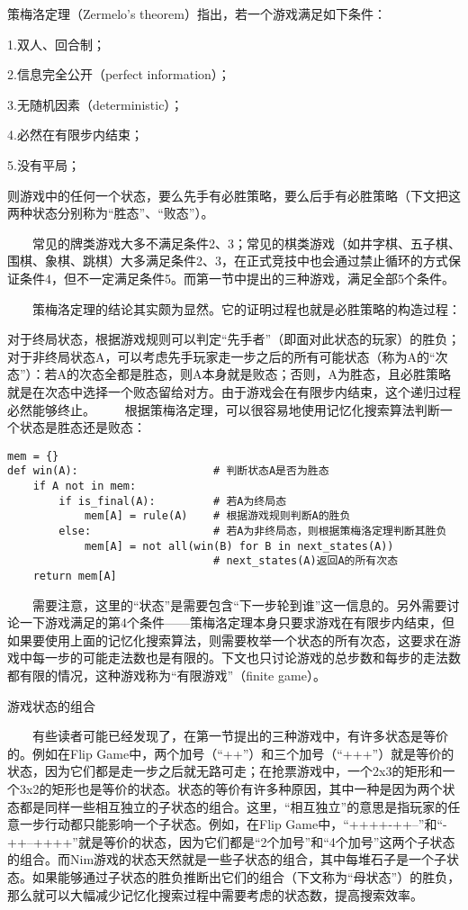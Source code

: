 策梅洛定理（Zermelo's theorem）指出，若一个游戏满足如下条件：

1.双人、回合制；

2.信息完全公开（perfect information）；

3.无随机因素（deterministic）；

4.必然在有限步内结束；

5.没有平局；

则游戏中的任何一个状态，要么先手有必胜策略，要么后手有必胜策略（下文把这两种状态分别称为“胜态”、“败态”）。

　　常见的牌类游戏大多不满足条件2、3；常见的棋类游戏（如井字棋、五子棋、围棋、象棋、跳棋）大多满足条件2、3，在正式竞技中也会通过禁止循环的方式保证条件4，但不一定满足条件5。而第一节中提出的三种游戏，满足全部5个条件。

　　策梅洛定理的结论其实颇为显然。它的证明过程也就是必胜策略的构造过程：

对于终局状态，根据游戏规则可以判定“先手者”（即面对此状态的玩家）的胜负；
对于非终局状态A，可以考虑先手玩家走一步之后的所有可能状态（称为A的“次态”）：若A的次态全都是胜态，则A本身就是败态；否则，A为胜态，且必胜策略就是在次态中选择一个败态留给对方。由于游戏会在有限步内结束，这个递归过程必然能够终止。
　　根据策梅洛定理，可以很容易地使用记忆化搜索算法判断一个状态是胜态还是败态：

\begin{lstlisting}
mem = {}
def win(A):                     # 判断状态A是否为胜态
    if A not in mem:
        if is_final(A):         # 若A为终局态
            mem[A] = rule(A)    # 根据游戏规则判断A的胜负
        else:                   # 若A为非终局态，则根据策梅洛定理判断其胜负
            mem[A] = not all(win(B) for B in next_states(A))
                                # next_states(A)返回A的所有次态
    return mem[A]

\end{lstlisting}

　　需要注意，这里的“状态”是需要包含“下一步轮到谁”这一信息的。另外需要讨论一下游戏满足的第4个条件——策梅洛定理本身只要求游戏在有限步内结束，但如果要使用上面的记忆化搜索算法，则需要枚举一个状态的所有次态，这要求在游戏中每一步的可能走法数也是有限的。下文也只讨论游戏的总步数和每步的走法数都有限的情况，这种游戏称为“有限游戏”（finite game）。

游戏状态的组合

　　有些读者可能已经发现了，在第一节提出的三种游戏中，有许多状态是等价的。例如在Flip Game中，两个加号（“++”）和三个加号（“+++”）就是等价的状态，因为它们都是走一步之后就无路可走；在抢票游戏中，一个2x3的矩形和一个3x2的矩形也是等价的状态。状态的等价有许多种原因，其中一种是因为两个状态都是同样一些相互独立的子状态的组合。这里，“相互独立”的意思是指玩家的任意一步行动都只能影响一个子状态。例如，在Flip Game中，“++++-++--”和“-++--++++”就是等价的状态，因为它们都是“2个加号”和“4个加号”这两个子状态的组合。而Nim游戏的状态天然就是一些子状态的组合，其中每堆石子是一个子状态。如果能够通过子状态的胜负推断出它们的组合（下文称为“母状态”）的胜负，那么就可以大幅减少记忆化搜索过程中需要考虑的状态数，提高搜索效率。

